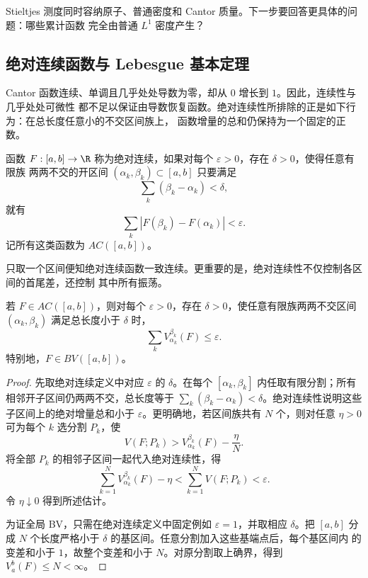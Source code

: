 Stieltjes 测度同时容纳原子、普通密度和 Cantor 质量。下一步要回答更具体的问题：哪些累计函数
完全由普通 $L^1$ 密度产生？

\subsection{绝对连续函数与 Lebesgue 基本定理}\label{subsec:4-2-3}

Cantor 函数连续、单调且几乎处处导数为零，却从 $0$ 增长到 $1$。因此，连续性与几乎处处可微性
都不足以保证由导数恢复函数。绝对连续性所排除的正是如下行为：在总长度任意小的不交区间族上，
函数增量的总和仍保持为一个固定的正数。

\begin{definition}[绝对连续]\label{def:4-2-3-1}
函数 $F:[a,b]\to\R$ 称为绝对连续，如果对每个 $\varepsilon>0$，存在 $\delta>0$，使得任意有限族
两两不交的开区间 $(\alpha_k,\beta_k)\subset[a,b]$ 只要满足
\[
 \sum_k(\beta_k-\alpha_k)<\delta,
\]
就有
\[
 \sum_k|F(\beta_k)-F(\alpha_k)|<\varepsilon.
\]
记所有这类函数为 $AC([a,b])$。
\end{definition}

只取一个区间便知绝对连续函数一致连续。更重要的是，绝对连续性不仅控制各区间的首尾差，还控制
其中所有振荡。

\begin{lemma}[短区间族的局部变差控制]\label{lemma:4-2-3-local-variation}
若 $F\in AC([a,b])$，则对每个 $\varepsilon>0$，存在 $\delta>0$，使任意有限族两两不交区间
$(\alpha_k,\beta_k)$ 满足总长度小于 $\delta$ 时，
\[
 \sum_k V_{\alpha_k}^{\beta_k}(F)\le\varepsilon.
\]
特别地，$F\in BV([a,b])$。
\end{lemma}

\begin{proof}
先取绝对连续定义中对应 $\varepsilon$ 的 $\delta$。在每个
$[\alpha_k,\beta_k]$ 内任取有限分割；所有相邻开子区间仍两两不交，总长度等于
$\sum_k(\beta_k-\alpha_k)<\delta$。绝对连续性说明这些子区间上的绝对增量总和小于
$\varepsilon$。更明确地，若区间族共有 $N$ 个，则对任意 $\eta>0$ 可为每个 $k$ 选分割 $P_k$，使
\[
 V(F;P_k)>V_{\alpha_k}^{\beta_k}(F)-\frac\eta N.
\]
将全部 $P_k$ 的相邻子区间一起代入绝对连续性，得
\[
 \sum_{k=1}^NV_{\alpha_k}^{\beta_k}(F)-\eta
 <\sum_{k=1}^NV(F;P_k)<\varepsilon.
\]
令 $\eta\downarrow0$ 得到所述估计。

为证全局 BV，只需在绝对连续定义中固定例如 $\varepsilon=1$，并取相应 $\delta$。把
$[a,b]$ 分成 $N$ 个长度严格小于 $\delta$ 的基区间。任意分割加入这些基端点后，每个基区间内
的变差和小于 $1$，故整个变差和小于 $N$。对原分割取上确界，得到 $V_a^b(F)\le N<\infty$。
\end{proof}

